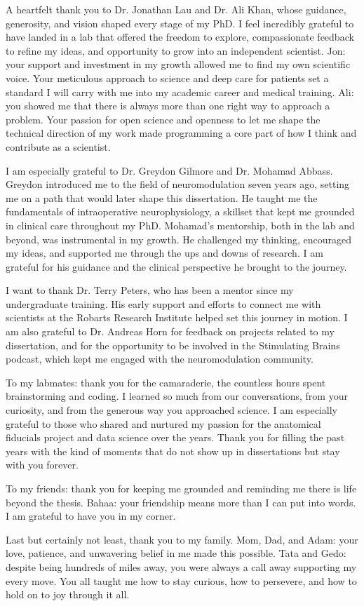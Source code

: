 \onehalfspacing
A heartfelt thank you to Dr. Jonathan Lau and Dr. Ali Khan, whose guidance, generosity, and vision shaped every stage of my PhD. I feel incredibly grateful to have landed in a lab that offered the freedom to explore, compassionate feedback to refine my ideas, and opportunity to grow into an independent scientist. Jon: your support and investment in my growth allowed me to find my own scientific voice. Your meticulous approach to science and deep care for patients set a standard I will carry with me into my academic career and medical training. Ali: you showed me that there is always more than one right way to approach a problem. Your passion for open science and openness to let me shape the technical direction of my work made programming a core part of how I think and contribute as a scientist.

I am especially grateful to Dr. Greydon Gilmore and Dr. Mohamad Abbass. Greydon introduced me to the field of neuromodulation seven years ago, setting me on a path that would later shape this dissertation. He taught me the fundamentals of intraoperative neurophysiology, a skillset that kept me grounded in clinical care throughout my PhD. Mohamad's mentorship, both in the lab and beyond, was instrumental in my growth. He challenged my thinking, encouraged my ideas, and supported me through the ups and downs of research. I am grateful for his guidance and the clinical perspective he brought to the journey.

I want to thank Dr. Terry Peters, who has been a mentor since my undergraduate training. His early support and efforts to connect me with scientists at the Robarts Research Institute helped set this journey in motion. I am also grateful to Dr. Andreas Horn for feedback on projects related to my dissertation, and for the opportunity to be involved in the Stimulating Brains podcast, which kept me engaged with the neuromodulation community.

To my labmates: thank you for the camaraderie, the countless hours spent brainstorming and coding. I learned so much from our conversations, from your curiosity, and from the generous way you approached science. I am especially grateful to those who shared and nurtured my passion for the anatomical fiducials project and data science over the years. Thank you for filling the past years with the kind of moments that do not show up in dissertations but stay with you forever.

To my friends: thank you for keeping me grounded and reminding me there is life beyond the thesis. Bahaa: your friendship means more than I can put into words. I am grateful to have you in my corner.

Last but certainly not least, thank you to my family. Mom, Dad, and Adam: your love, patience, and unwavering belief in me made this possible. Tata and Gedo: despite being hundreds of miles away, you were always a call away supporting my every move. You all taught me how to stay curious, how to persevere, and how to hold on to joy through it all.











